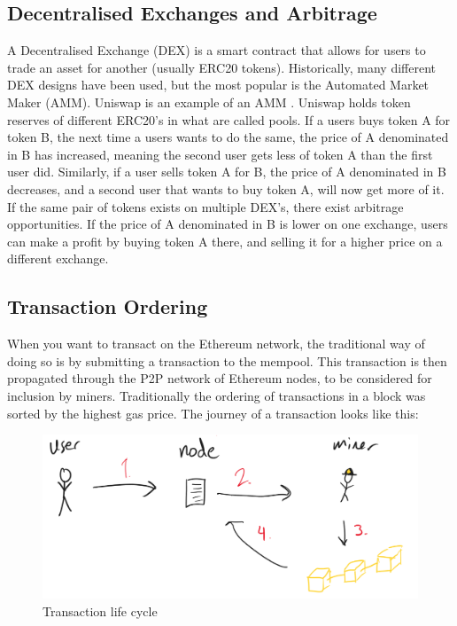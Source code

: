 \subsection{Decentralised Exchanges and Arbitrage}
A Decentralised Exchange (DEX) is a smart contract that allows for users to trade an asset for another (usually ERC20 tokens). Historically, many different DEX designs have been used, but the most popular is the Automated Market Maker (AMM). Uniswap is an example of an AMM \cite{uniswap}. Uniswap holds token reserves of different ERC20's in what are called pools. If a users buys token A for token B, the next time a users wants to do the same, the price of A denominated in B has increased, meaning the second user gets less of token A than the first user did. Similarly, if a user sells token A for B, the price of A denominated in B decreases, and a second user that wants to buy token A, will now get more of it. If the same pair of tokens exists on multiple DEX's, there exist arbitrage opportunities. If the price of A denominated in B is lower on one exchange, users can make a profit by buying token A there, and selling it for a higher price on a different exchange. 

\subsection{Transaction Ordering}
When you want to transact on the Ethereum network, the traditional way of doing so is by submitting a transaction to the mempool. This transaction is then propagated through the P2P network of Ethereum nodes, to be considered for inclusion by miners. Traditionally the ordering of transactions in a block was sorted by the highest gas price. The journey of a transaction looks like this: 

\begin{figure}[H]
    \centering
    \includegraphics[width=\textwidth]{3_FIGURES/Theory/Transaction1.PNG}
    \caption{Transaction life cycle}
    \label{transaction1}
\end{figure}

